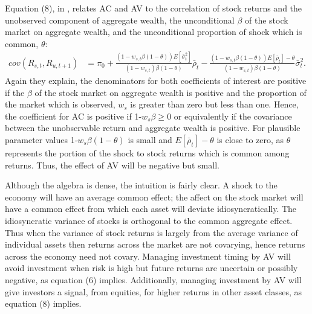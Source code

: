 Equation (8), in \cite{pollet_average_2010}, relates AC and AV to the correlation of stock returns and the unobserved component of aggregate wealth, the unconditional $\beta$ of the stock market on aggregate wealth, and the unconditional proportion of shock which is common, $\theta$: 
\begin{align*}
cov(R_{s,t},R_{u,t+1}) &= \pi_{0} + \frac{(1-w_{s,t}\beta(1-\theta))E[\bar{\sigma}^{2}_{t}]}{(1-w_{s,t})\beta(1-\theta)}\bar{\rho}_{t}- \frac{(1-w_{s,t}\beta(1-\theta))E[\bar{\rho}_{t}]-\theta}{(1-w_{s,t})\beta(1-\theta)}\bar{\sigma}^{2}_{t}.
\end{align*}
Again they explain, the denominators for both coefficients of interest are positive if the $\beta$ of the stock market on aggregate wealth is positive and the proportion of the market which is observed, $w_{s}$ is greater than zero but less than one. Hence, the coefficient for AC is positive if 1-$w_{s}\beta \geq 0$ or equivalently if the covariance between the unobservable return and aggregate wealth is positive. For plausible parameter values 1-$w_{s}\beta(1-\theta)$ is small and $E[\bar{\rho}_{t}]-\theta$ is close to zero, as $\theta$ represents the portion of the shock to stock returns which is common among returns. Thus, the effect of AV will be negative but small. 

Although the algebra is dense, the intuition is fairly clear. A shock to the economy will have an average common effect; the affect on the stock market will have a common effect from which each asset will deviate idiosyncratically. The idiosyncratic variance of stocks is orthogonal to the common aggregate effect. Thus when the variance of stock returns is largely from the average variance of individual assets then returns across the market are not covarying, hence returns across the economy need not covary. Managing investment timing by AV will avoid investment when risk is high but future returns are uncertain or possibly negative, as equation (6) implies. Additionally, managing investment by AV will give investors a signal, from equities, for higher returns in other asset classes, as equation (8) implies.

